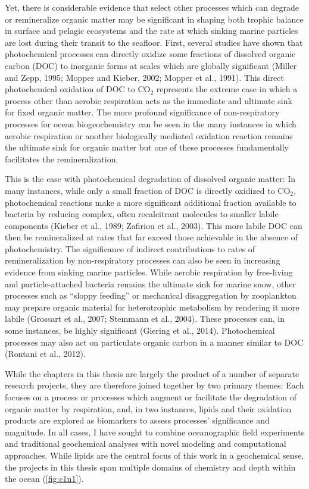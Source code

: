 Yet, there is considerable evidence that select other processes which can degrade or remineralize organic matter may be significant in shaping both trophic balance in surface and pelagic ecosystems and the rate at which sinking marine particles are lost during their transit to the seafloor. First, several studies have shown that photochemical processes can directly oxidize some fractions of dissolved organic carbon (DOC) to inorganic forms at scales which are globally significant (Miller and Zepp, 1995; Mopper and Kieber, 2002; Mopper et al., 1991). This direct photochemical oxidation of DOC to CO$_2$ represents the extreme case in which a process other than aerobic respiration acts as the immediate and ultimate sink for fixed organic matter. The more profound significance of non-respiratory processes for ocean biogeochemistry can be seen in the many instances in which aerobic respiration or another biologically mediated oxidation reaction remains the ultimate sink for organic matter but one of these processes fundamentally facilitates the remineralization.

This is the case with photochemical degradation of dissolved organic matter: In many instances, while only a small fraction of DOC is directly oxidized to CO$_2$, photochemical reactions make a more significant additional fraction available to bacteria by reducing complex, often recalcitrant molecules to smaller labile components (Kieber et al., 1989; Zafiriou et al., 2003). This more labile DOC can then be remineralized at rates that far exceed those achievable in the absence of photochemistry. The significance of indirect contributions to rates of remineralization by non-respiratory processes can also be seen in increasing evidence from sinking marine particles. While aerobic respiration by free-living and particle-attached bacteria remains the ultimate sink for marine snow, other processes such as ``sloppy feeding'' or mechanical disaggregation by zooplankton may prepare organic material for heterotrophic metabolism by rendering it more labile (Grossart et al., 2007; Stemmann et al., 2004). These processes can, in some instances, be highly significant (Giering et al., 2014). Photochemical processes may also act on particulate organic carbon in a manner similar to DOC (Rontani et al., 2012).

While the chapters in this thesis are largely the product of a number of separate research projects, they are therefore joined together by two primary themes: Each focuses on a process or processes which augment or facilitate the degradation of organic matter by respiration, and, in two instances, lipids and their oxidation products are explored as biomarkers to assess processes' significance and magnitude. In all cases, I have sought to combine oceanographic field experiments and traditional geochemical analyses with novel modeling and computational approaches. While lipids are the central focus of this work in a geochemical sense, the projects in this thesis span multiple domains of chemistry and depth within the ocean (\autoref{fig:c1n1}).

